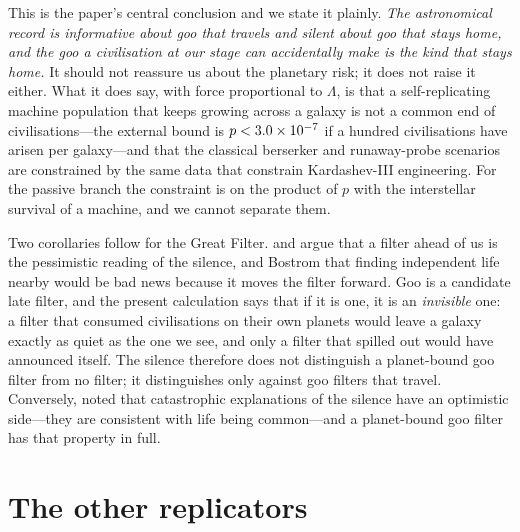 \documentclass[11pt]{article}
\begin{document}
This is the paper's central conclusion and we state it plainly.  \emph{The
astronomical record is informative about goo that travels and silent about goo
that stays home, and the goo a civilisation at our stage can accidentally
make is the kind that stays home.}  It should not reassure us about the
planetary risk; it does not raise it either.  What it does say, with force
proportional to $\Lambda$, is that a self-replicating machine population that
keeps growing across a galaxy is not a common end of civilisations---the
external bound is $p<3.0\times10^{-7}$ if a hundred civilisations
have arisen per galaxy---and that the classical berserker and
runaway-probe scenarios are constrained by the same data that constrain
Kardashev-III engineering.  For the passive branch the constraint is on the
product of $p$ with the interstellar survival of a machine, and we cannot
separate them.

Two corollaries follow for the Great Filter.  \citet{Hanson1998} and
\citet{Bostrom2008} argue that a filter ahead of us is the pessimistic
reading of the silence, and Bostrom that finding independent life nearby
would be bad news because it moves the filter forward.  Goo is a candidate
late filter, and the present calculation says that if it is one, it is an
\emph{invisible} one: a filter that consumed civilisations on their own planets
would leave a galaxy exactly as quiet as the one we see, and only a filter that
spilled out would have announced itself.  The silence therefore does not
distinguish a planet-bound goo filter from no filter; it distinguishes only
against goo filters that travel.  Conversely, \citet{Cirkovic2004} noted that
catastrophic explanations of the silence have an optimistic side---they are
consistent with life being common---and a planet-bound goo filter has that
property in full.

\section{The other replicators}
\label{sec:general}
\end{document}
